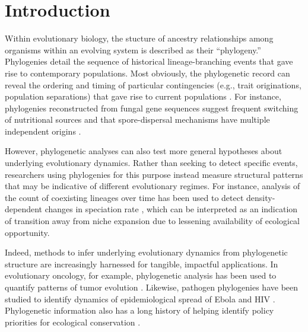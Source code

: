 \section{Introduction}
\label{sec:introduction}

Within evolutionary biology, the stucture of ancestry relationships among organisms within an evolving system is described as their ``phylogeny.''
Phylogenies detail the sequence of historical lineage-branching events that gave rise to contemporary populations.
Most obviously, the phylogenetic record can reveal the ordering and timing of particular contingencies (e.g., trait originations, population separations) that gave rise to current populations \citep{pagel1999inferring,arbogast2002estimating}.
For instance, phylogenies reconstructed from fungal gene sequences suggest frequent switching of nutritional sources and that spore-dispersal mechanisms have multiple independent origins \citep{james2006reconstructing}.

However, phylogenetic analyses can also test more general hypotheses about underlying evolutionary dynamics.
Rather than seeking to detect specific events, researchers using phylogenies for this purpose instead measure structural patterns that may be indicative of different evolutionary regimes.
For instance, analysis of the count of coexisting lineages over time has been used to detect density-dependent changes in speciation rate \citep{rabosky2008density}, which can be interpreted as an indication of transition away from niche expansion due to lessening availability of ecological opportunity.

Indeed, methods to infer underlying evolutionary dynamics from phylogenetic structure are increasingly harnessed for tangible, impactful applications.
In evolutionary oncology, for example, phylogenetic analysis has been used to quantify patterns of tumor evolution \citep{scottInferringTumorProliferative2020,lewinsohnStatedependentEvolutionaryModels2023}.
Likewise, pathogen phylogenies have been studied to identify dynamics of epidemiological spread of Ebola and HIV \citep{giardina2017inference,saulnier2017inferring,voznica2022deep}.
Phylogenetic information also has a long history of helping identify policy priorities for ecological conservation \citep{forestPreservingEvolutionaryPotential2007}.


